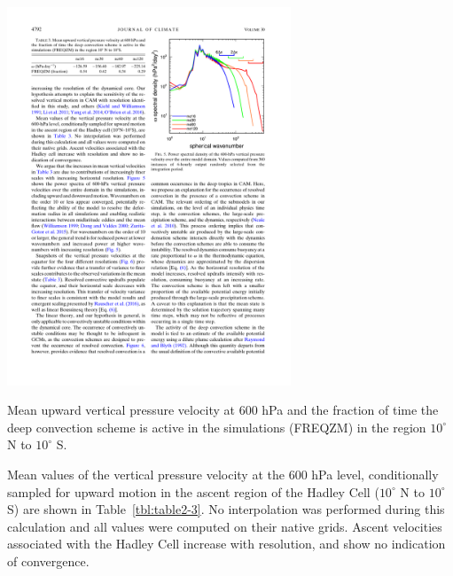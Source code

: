 \begin{table}[t]
\begin{center}
\noindent\includegraphics[width=20pc,angle=0]{chapter2/table3.pdf}\\
\end{center}
\caption{Mean upward vertical pressure velocity at 600 hPa and the fraction of time the deep convection scheme is active in the simulations (FREQZM) in the region $10^{\circ}$ N to $10^{\circ}$ S. }
\label{tbl:table2-3}
\end{table}

Mean values of the vertical pressure velocity at the 600 hPa level, conditionally sampled for upward motion in the ascent region of the Hadley Cell ($10^{\circ}$ N to $10^{\circ}$ S) are shown in Table~\ref{tbl:table2-3}. No interpolation was performed during this calculation and all values were computed on their native grids. Ascent velocities associated with the Hadley Cell increase with resolution, and show no indication of convergence. 

